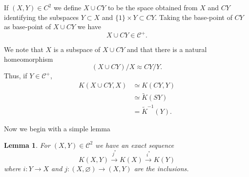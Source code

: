 \documentclass[leqno]{book}
\numberwithin{equation}{section}
\newtheorem{lemma}[theorem]{Lemma}
\theoremstyle{definition}
\begin{document}
            If $(X,Y) \in C^{2}$ we define $X\cup CY$ to be the space obtained from $X$ and $CY$ identifying the subspaces $Y \subset X$ and $\{1\}\times Y \subset CY$. Taking the base-point of $CY$ as base-point of $X\cup CY$ we have
            \begin{equation*}
              X\cup CY \in \mathcal{C}^{+}.
            \end{equation*}

            We note that $X$ is a subspace of $X\cup CY$ and that there is a natural homeomorphism
            \begin{equation*}
              (X \cup CY)/X \approx CY /Y.
            \end{equation*}
            Thus, if $Y\in \mathcal{C}^{+}$,
            \begin{equation*}
              \begin{aligned}
              K(X\cup CY,X) &\simeq K(CY,Y) \\
              &\simeq \tilde{K}(SY) \\
              &= \tilde{K}^{-1}(Y).
              \end{aligned}
            \end{equation*}

            Now we begin with a simple lemma
            \begin{lemma}
              For $(X,Y)\in \mathcal{C}^{2}$ we have an exact sequence
              \begin{equation*}
                K(X,Y)\stackrel{j^{*}}{\rightarrow}K(X)\stackrel{i^{*}}{\rightarrow}{K(Y)}
              \end{equation*}
              where $i:Y\to X$ and $j:(X,\varnothing)\to (X,Y)$ are the inclusions.
            \end{lemma}
\end{document}
